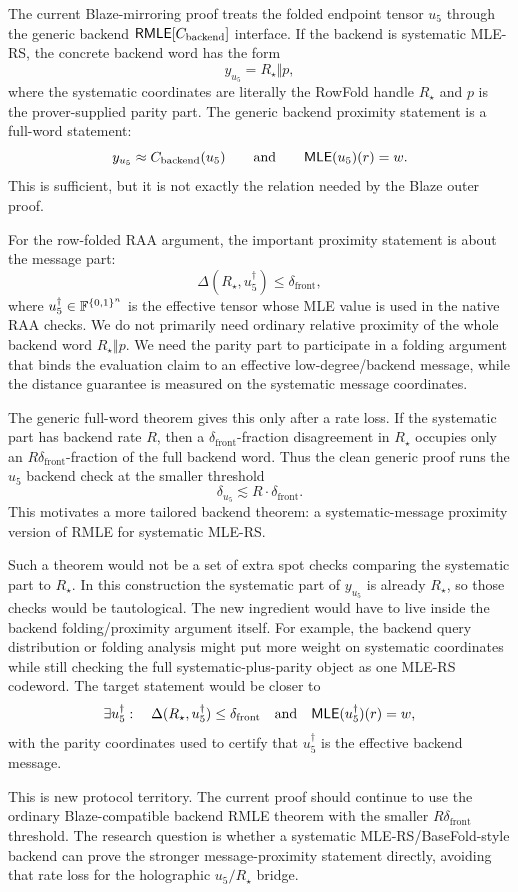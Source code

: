 The current Blaze-mirroring proof treats the folded endpoint tensor \(u_5\)
through the generic backend \(\mathsf{RMLE}[C_{\mathrm{backend}}]\) interface.  If the
backend is systematic MLE-RS, the concrete backend word has the form
\[
  y_{u_5}=R_\star\Vert p,
\]
where the systematic coordinates are literally the RowFold handle \(R_\star\)
and \(p\) is the prover-supplied parity part.  The generic backend proximity
statement is a full-word statement:
\[
  y_{u_5}\approx C_{\mathrm{backend}}(u_5)
  \qquad\text{and}\qquad
  \mathsf{MLE}(u_5)(r)=w.
\]
This is sufficient, but it is not exactly the relation needed by the Blaze
outer proof.

For the row-folded RAA argument, the important proximity statement is about the
message part:
\[
  \Delta(R_\star,u_5^\dagger)\le \delta_{\mathrm{front}},
\]
where \(u_5^\dagger\in\mathbb{F}^{\{0,1\}^n}\) is the effective tensor whose MLE value is
used in the native RAA checks.  We do not primarily need ordinary relative
proximity of the whole backend word \(R_\star\Vert p\).  We need the parity
part to participate in a folding argument that binds the evaluation claim to an
effective low-degree/backend message, while the distance guarantee is measured
on the systematic message coordinates.

The generic full-word theorem gives this only after a rate loss.  If the
systematic part has backend rate \(R\), then a
\(\delta_{\mathrm{front}}\)-fraction disagreement in \(R_\star\) occupies only
an \(R\delta_{\mathrm{front}}\)-fraction of the full backend word.  Thus the
clean generic proof runs the \(u_5\) backend check at the smaller threshold
\[
  \delta_{u_5}\lesssim R\cdot\delta_{\mathrm{front}}.
\]
This motivates a more tailored backend theorem: a systematic-message proximity
version of RMLE for systematic MLE-RS.

Such a theorem would not be a set of extra spot checks comparing the systematic
part to \(R_\star\).  In this construction the systematic part of
\(y_{u_5}\) is already \(R_\star\), so those checks would be tautological.  The
new ingredient would have to live inside the backend folding/proximity
argument itself.  For example, the backend query distribution or folding
analysis might put more weight on systematic coordinates while still checking
the full systematic-plus-parity object as one MLE-RS codeword.  The target
statement would be closer to
\[
  \exists u_5^\dagger:
  \quad
  \Delta(R_\star,u_5^\dagger)\le\delta_{\mathrm{front}}
  \quad\text{and}\quad
  \mathsf{MLE}(u_5^\dagger)(r)=w,
\]
with the parity coordinates used to certify that \(u_5^\dagger\) is the
effective backend message.

This is new protocol territory.  The current proof should continue to use the
ordinary Blaze-compatible backend RMLE theorem with the smaller
\(R\delta_{\mathrm{front}}\) threshold.  The research question is whether a
systematic MLE-RS/BaseFold-style backend can prove the stronger
message-proximity statement directly, avoiding that rate loss for the
holographic \(u_5/R_\star\) bridge.
